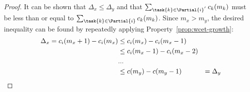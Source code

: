 \begin{theorem}
\begin{proof}
   It can be shown that ${\Delta_x \le \Delta_y}$ and that
   ${\sum_{\task{k} \in \Partial{i}^{'}} c_k(m_k)}$ must be less than
   or equal to ${\sum_{\task{k} \in \Partial{i}} c_k(m_k)}$.
   Since ${m_x > m_y}$, the desired inequality can be found by
   repeatedly applying Property~\ref{prop:wcet-growth}:
   \begin{equation*}
     \indent
     \begin{split}
       \Delta_x =
       c_i(m_x + 1) - c_i(m_x) &\le c_i(m_x) - c_i(m_x - 1) \\
       &\le c_i(m_x - 1) - c_i(m_x - 2) \\
       &... \\
       &\le c(m_y) - c(m_y - 1)
       &= \Delta_y
     \end{split}
   \end{equation*}
  \end{proof}
\end{theorem}

